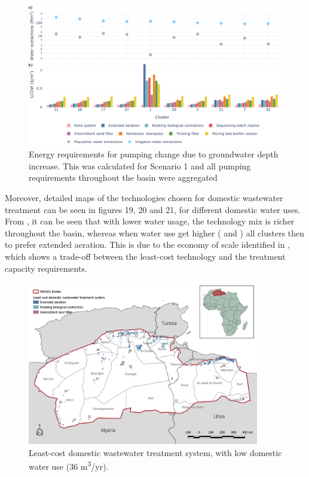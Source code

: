 \documentclass[12pt]{iopart}
\begin{document}
\begin{figure}[!h]
	\centering
	\includegraphics[width=\textwidth]{BaselineLCOW_largest_clusters}
	\caption{Energy requirements for pumping change due to groundwater depth increase. This was calculated for Scenario 1 and all pumping requirements throughout the basin were aggregated}
	\label{fig:lcowlargestclusters}
\end{figure}

Moreover, detailed maps of the technologies chosen for domestic wastewater treatment can be seen in figures 19, 20 and 21, for different domestic water uses. From , it can be seen that with lower water usage, the technology mix is richer throughout the basin, whereas when water use get higher ( and ) all clusters then to prefer extended aeration. This is due to the economy of scale identified in , which shows a trade-off between the least-cost technology and the treatment capacity requirements.

\begin{figure}[!h]
	\centering
	\includegraphics[width=0.9\textwidth, cfbox=black 1pt 0pt]{NWSAS_least_low_demand}
	\caption{Least-cost domestic wastewater treatment system, with low domestic water use (36 m\textsuperscript{3}/yr).}
	\label{fig:leastLowDemand}
\end{figure}
\end{document}
